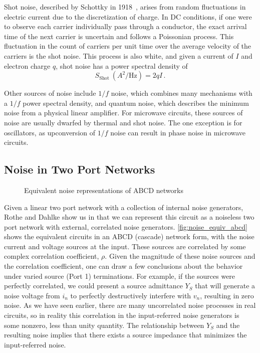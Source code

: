 Shot noise, described by Schottky in 1918~\cite{schottkyUberSpontaneStromschwankungen1918}, arises from random fluctuations in electric current due to the discretization of charge.
In DC conditions, if one were to observe each carrier individually pass through a conductor, the exact arrival time of the next carrier is uncertain and follows a Poissonian process.
This fluctuation in the count of carriers per unit time over the average velocity of the carriers is the shot noise.
This process is also white, and given a current of $I$ and electron charge $q$, shot noise has a power spectral density of
\begin{equation}
    S_\text{Shot}~(A^2/\text{Hz}) = 2qI\,.
    \label{eq:shot_nosie}
\end{equation}

Other sources of noise include $1/f$ noise, which combines many mechanisms with a $1/f$ power spectral density, and quantum noise, which describes the minimum noise from a physical linear amplifier.
For microwave circuits, these sources of noise are usually dwarfed by thermal and shot noise.
The one exception is for oscillators, as upconversion of $1/f$ noise can result in phase noise in microwave circuits.

\subsection{Noise in Two Port Networks}

\begin{figure}[ht!]%
    \centering
    \subfloat{}%
    \quad%
    \subfloat{}%
    \caption{Equivalent noise representations of ABCD networks}%
    \label{fig:noise_equiv_abcd}%
\end{figure}

Given a linear two port network with a collection of internal noise generators, Rothe and Dahlke show us in \cite{rotheTheoryNoisyFourpoles1956} that we can represent this circuit as a noiseless two port network with external, correlated noise generators.
\autoref{fig:noise_equiv_abcd} shows the equivalent circuits in an ABCD (cascade) network form, with the noise current and voltage sources at the input.
These sources are correlated by some complex correlation coefficient, $\rho$.
Given the magnitude of these noise sources and the correlation coefficient, one can draw a few conclusions about the behavior under varied source (Port 1) terminations.
For example, if the sources were perfectly correlated, we could present a source admittance $Y_S$ that will generate a noise voltage from $i_n$ to perfectly destructively interfere with $v_n$, resulting in zero noise.
As we have seen earlier, there are many uncorrelated noise processes in real circuits, so in reality this correlation in the input-referred noise generators is some nonzero, less than unity quantity.
The relationship between $Y_S$ and the resulting noise implies that there exists a source impedance that minimizes the input-referred noise.


